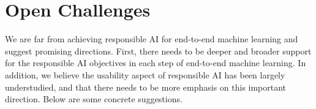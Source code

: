 \documentclass[11pt]{article}
\begin{document}






\section{Open Challenges}
\label{sec:future}

We are far from achieving responsible AI for end-to-end machine learning and suggest promising directions. First, there needs to be deeper and broader support for the responsible AI objectives in each step of end-to-end machine learning. In addition, we believe the usability aspect of responsible AI has been largely understudied, and that there needs to be more emphasis on this important direction. Below are some concrete suggestions.
\end{document}
